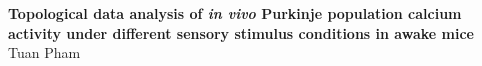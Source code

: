 \begin{flushleft}
{\Large
\textbf{Topological data analysis of \textit{in vivo} Purkinje population calcium activity under different sensory stimulus conditions in awake mice}
}
\newline
\\
Tuan Pham

\end{flushleft}